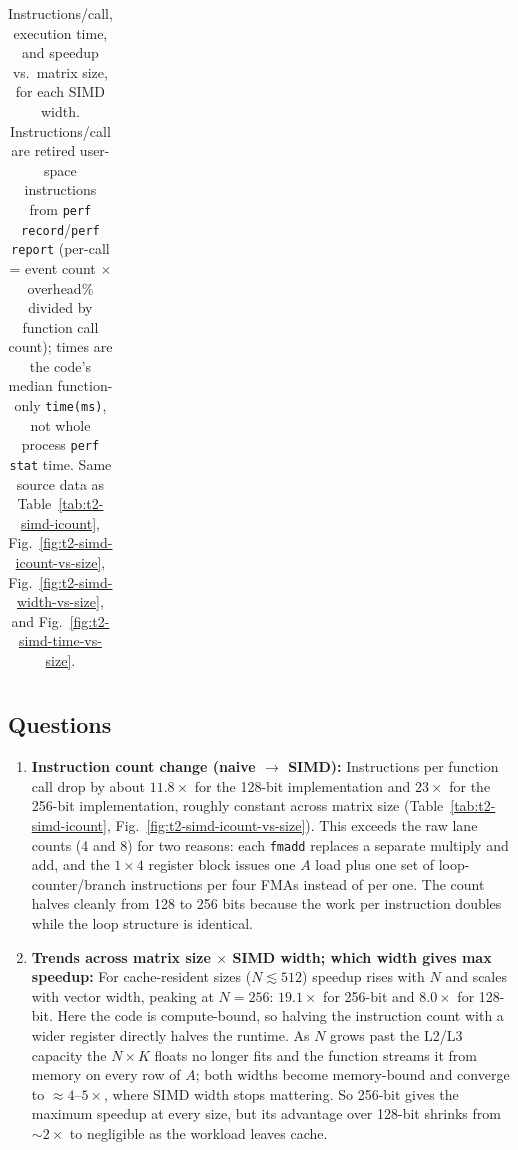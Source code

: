 \documentclass[11pt]{article}
\begin{document}
\begin{table}[H]
{\begin{tabular}{ll ccccccccccc}
        \bottomrule
    \end{tabular}}
    \caption{Instructions/call, execution time, and speedup vs.\ matrix size, for each SIMD
    width. Instructions/call are retired user-space instructions from
    \texttt{perf record}/\texttt{perf report} (per-call = event count $\times$ overhead\%
    divided by function call count); times are the code's median
    function-only \texttt{time(ms)}, not whole process \texttt{perf stat} time. Same source data as
    Table~\ref{tab:t2-simd-icount}, Fig.~\ref{fig:t2-simd-icount-vs-size},
    Fig.~\ref{fig:t2-simd-width-vs-size}, and Fig.~\ref{fig:t2-simd-time-vs-size}.}
    \label{tab:t2-simd-summary}
\end{table}

\subsection{Questions}
\begin{enumerate}[leftmargin=1.6em, itemsep=0.3em]
    \item \textbf{Instruction count change (naive $\to$ SIMD):}
    Instructions per function call drop by about $11.8\times$ for the
    128-bit implementation and $23\times$ for the 256-bit implementation, roughly constant
    across matrix size (Table~\ref{tab:t2-simd-icount},
    Fig.~\ref{fig:t2-simd-icount-vs-size}). This exceeds the raw lane counts
    (4 and 8) for two reasons: each \texttt{fmadd} replaces a separate
    multiply and add, and the $1\times4$ register block issues one $A$ load
    plus one set of loop-counter/branch instructions per four FMAs instead of
    per one. The count halves cleanly from 128 to 256 bits because the work
    per instruction doubles while the loop structure is identical.

    \item \textbf{Trends across matrix size $\times$ SIMD width; which width
    gives max speedup:}
    For cache-resident sizes ($N \lesssim 512$) speedup rises with $N$ and
    scales with vector width, peaking at $N{=}256$: $19.1\times$ for 256-bit
    and $8.0\times$ for 128-bit. Here the code is compute-bound, so halving
    the instruction count with a wider register directly halves the runtime.
    As $N$ grows past the L2/L3 capacity the $N\times K$ floats
    no longer fits and the function streams it from memory on every
    row of $A$; both widths become memory-bound and converge to
    $\approx 4$--$5\times$, where SIMD width stops mattering. So 256-bit
    gives the maximum speedup at every size, but its advantage over
    128-bit shrinks from $\sim 2\times$ to negligible as the workload leaves
    cache.
\end{enumerate}
\end{document}
